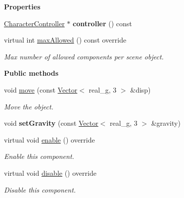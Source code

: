 \begin{Indent}\textbf{ Properties}\par
\begin{DoxyCompactItemize}
\item 
\mbox{\label{classrev_1_1_char_control_component_a185676aa126e70a1a5f772ad210e04e5}} 
\mbox{\hyperlink{classrev_1_1_character_controller}{Character\+Controller}} $\ast$ {\bfseries controller} () const
\item 
\mbox{\label{classrev_1_1_char_control_component_a0bbb105cdc5c80ed066045822a70dc3b}} 
virtual int \mbox{\hyperlink{classrev_1_1_char_control_component_a0bbb105cdc5c80ed066045822a70dc3b}{max\+Allowed}} () const override
\begin{DoxyCompactList}\small\item\em Max number of allowed components per scene object. \end{DoxyCompactList}\end{DoxyCompactItemize}
\end{Indent}
\begin{Indent}\textbf{ Public methods}\par
\begin{DoxyCompactItemize}
\item 
void \mbox{\hyperlink{classrev_1_1_char_control_component_a7af709870507cde2ad2151c0e510e2c6}{move}} (const \mbox{\hyperlink{classrev_1_1_vector}{Vector}}$<$ real\+\_\+g, 3 $>$ \&disp)
\begin{DoxyCompactList}\small\item\em Move the object. \end{DoxyCompactList}\item 
\mbox{\label{classrev_1_1_char_control_component_ab2f59a7f357e71a5896c93d72b6652e0}} 
void {\bfseries set\+Gravity} (const \mbox{\hyperlink{classrev_1_1_vector}{Vector}}$<$ real\+\_\+g, 3 $>$ \&gravity)
\item 
\mbox{\label{classrev_1_1_char_control_component_a19f02b9c17cca9bce9ede1b03c5879c1}} 
virtual void \mbox{\hyperlink{classrev_1_1_char_control_component_a19f02b9c17cca9bce9ede1b03c5879c1}{enable}} () override
\begin{DoxyCompactList}\small\item\em Enable this component. \end{DoxyCompactList}\item 
\mbox{\label{classrev_1_1_char_control_component_ad06fd72eb6af5d3a5c05df0d38e5264a}} 
virtual void \mbox{\hyperlink{classrev_1_1_char_control_component_ad06fd72eb6af5d3a5c05df0d38e5264a}{disable}} () override
\begin{DoxyCompactList}\small\item\em Disable this component. \end{DoxyCompactList}\end{DoxyCompactItemize}
\end{Indent}
